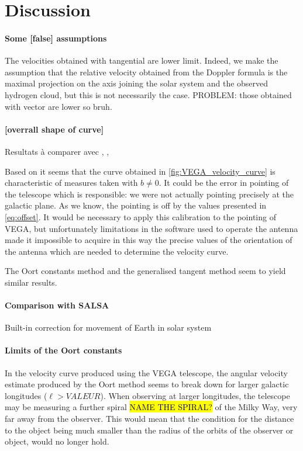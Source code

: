 \section{Discussion}
\paragraph{Some [false] assumptions}
The velocities obtained with tangential are lower limit.
Indeed, we make the assumption that the relative velocity obtained from the Doppler formula is the maximal projection on the axis joining the solar system and the observed hydrogen cloud, but this is not necessarily the case.
PROBLEM: those obtained with vector are lower so bruh.

\paragraph{[overrall shape of curve]}
Resultats à comparer avec \cite{ou_dark_2024}, \cite{jia_research_2022}, \cite{mroz_rotation_2019}

Based on \cite{sakhawat_hossain_salsa_2018} it seems that the curve obtained in \autoref{fig:VEGA_velocity_curve} is characteristic of measures taken with $b \neq 0$. It could be the error in pointing of the telescope which is responsible: we were not actually pointing precisely at the galactic plane. As we know, the pointing is off by the values presented in \autoref{eq:offset}.
It would be necessary to apply this calibration to the pointing of VEGA, but unfortunately limitations in the software used to operate the antenna made it  impossible to acquire in this way the precise values of the orientation of the antenna which are needed to determine the velocity curve.

The Oort constants method and the generalised tangent method seem to yield similar results.

\paragraph{Comparison with SALSA}
Built-in correction for movement of Earth in solar system

\paragraph{Limits of the Oort constants}
In the velocity curve produced using the VEGA telescope, the angular velocity estimate produced by the Oort method seems to break down for larger galactic longitudes ($\ell > VALEUR$). When observing at larger longitudes, the telescope may be measuring a further spiral \hl{NAME THE SPIRAL?} of the Milky Way, very far away from the observer. This would mean that the condition for the distance to the object being much smaller than the radius of the orbits of the observer or object, would no longer hold. 

